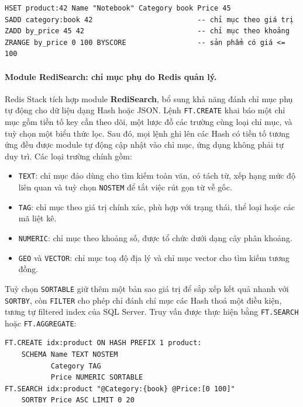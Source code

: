 \begin{verbatim}
HSET product:42 Name "Notebook" Category book Price 45
SADD category:book 42                         -- chỉ mục theo giá trị
ZADD by_price 45 42                           -- chỉ mục theo khoảng
ZRANGE by_price 0 100 BYSCORE                 -- sản phẩm có giá <= 100
\end{verbatim}

\paragraph{Module RediSearch: chỉ mục phụ do Redis quản lý.} Redis Stack tích hợp module \textbf{RediSearch}, bổ sung khả năng đánh chỉ mục phụ tự động cho dữ liệu dạng Hash hoặc JSON. Lệnh \texttt{FT.CREATE} khai báo một chỉ mục gồm tiền tố key cần theo dõi, một lược đồ các trường cùng loại chỉ mục, và tuỳ chọn một biểu thức lọc. Sau đó, mọi lệnh ghi lên các Hash có tiền tố tương ứng đều được module tự động cập nhật vào chỉ mục, ứng dụng không phải tự duy trì. Các loại trường chính gồm:

\begin{itemize}
    \item \texttt{TEXT}: chỉ mục đảo dùng cho tìm kiếm toàn văn, có tách từ, xếp hạng mức độ liên quan và tuỳ chọn \texttt{NOSTEM} để tắt việc rút gọn từ về gốc.
    \item \texttt{TAG}: chỉ mục theo giá trị chính xác, phù hợp với trạng thái, thể loại hoặc các mã liệt kê.
    \item \texttt{NUMERIC}: chỉ mục theo khoảng số, được tổ chức dưới dạng cây phân khoảng.
    \item \texttt{GEO} và \texttt{VECTOR}: chỉ mục toạ độ địa lý và chỉ mục vector cho tìm kiếm tương đồng.
\end{itemize}

Tuỳ chọn \texttt{SORTABLE} giữ thêm một bản sao giá trị để sắp xếp kết quả nhanh với \texttt{SORTBY}, còn \texttt{FILTER} cho phép chỉ đánh chỉ mục các Hash thoả một điều kiện, tương tự filtered index của SQL Server. Truy vấn được thực hiện bằng \texttt{FT.SEARCH} hoặc \texttt{FT.AGGREGATE}:

\begin{verbatim}
FT.CREATE idx:product ON HASH PREFIX 1 product:
    SCHEMA Name TEXT NOSTEM
           Category TAG
           Price NUMERIC SORTABLE
FT.SEARCH idx:product "@Category:{book} @Price:[0 100]"
    SORTBY Price ASC LIMIT 0 20
\end{verbatim}


